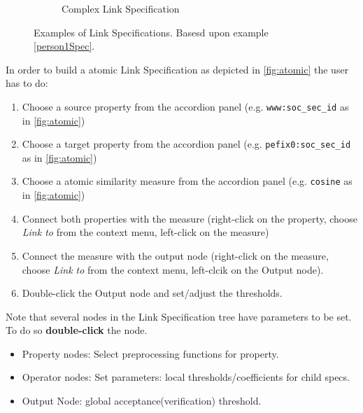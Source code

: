 \documentclass[oneside,a4paper,12pt]{memoir}
\begin{document}
\begin{figure}
\begin{subfigure}[b]{0.6\textwidth}
                \caption{Complex Link Specification}
                \label{fig:complex}
        \end{subfigure}
        \caption{Examples of Link Specifications. Basesd upon example \ref{person1Spec}.}
\label{fig:metrics}
\end{figure}

In order to build a atomic Link Specification as depicted in \ref{fig:atomic} the user has to do:

\begin{enumerate}
	\item Choose a source property from the accordion panel (e.g. \texttt{www:soc\_sec\_id} as in \ref{fig:atomic})
	\item Choose a target property from the accordion panel (e.g. \texttt{pefix0:soc\_sec\_id} as in \ref{fig:atomic})
	\item Choose a atomic similarity measure from the accordion panel (e.g. \texttt{cosine} as in \ref{fig:atomic})
	\item Connect both properties with the measure (right-click on the property, choose \textit{Link to} from the context menu, left-click on the measure)
	\item Connect the measure with the output node (right-click on the measure, choose \textit{Link to} from the context menu, left-clcik on the Output node).
	\item Double-click the Output node and set/adjust the thresholds.
\end{enumerate}

Note that several nodes in the Link Specification tree have parameters to be set. To do so \textbf{double-click} the node.
\begin{itemize}
	\item Property nodes: Select preprocessing functions for property.
	\item Operator nodes: Set parameters: local thresholds/coefficients for child specs.
	\item Output Node: global acceptance(verification) threshold.
\end{itemize}
\end{document}
